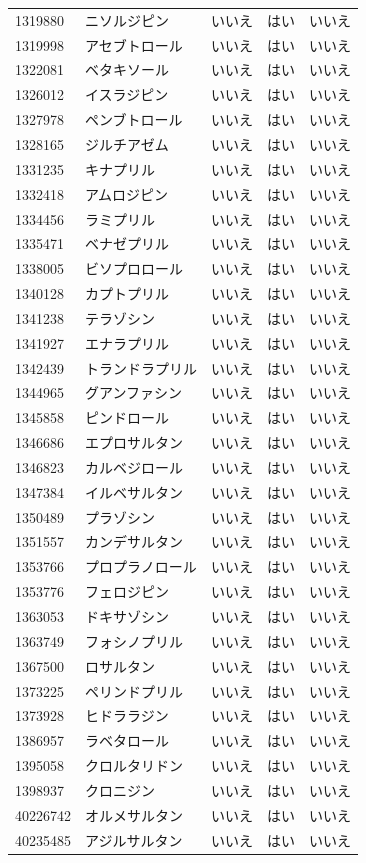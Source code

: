 \documentclass[
  11pt]{book}
\theoremstyle{definition}
\theoremstyle{definition}
\theoremstyle{definition}
\theoremstyle{definition}
\theoremstyle{remark}
\begin{document}
\begin{longtable}[]{@{}lllll@{}}
1319880 & ニソルジピン & いいえ & はい & いいえ \\
1319998 & アセブトロール & いいえ & はい & いいえ \\
1322081 & ベタキソール & いいえ & はい & いいえ \\
1326012 & イスラジピン & いいえ & はい & いいえ \\
1327978 & ペンブトロール & いいえ & はい & いいえ \\
1328165 & ジルチアゼム & いいえ & はい & いいえ \\
1331235 & キナプリル & いいえ & はい & いいえ \\
1332418 & アムロジピン & いいえ & はい & いいえ \\
1334456 & ラミプリル & いいえ & はい & いいえ \\
1335471 & ベナゼプリル & いいえ & はい & いいえ \\
1338005 & ビソプロロール & いいえ & はい & いいえ \\
1340128 & カプトプリル & いいえ & はい & いいえ \\
1341238 & テラゾシン & いいえ & はい & いいえ \\
1341927 & エナラプリル & いいえ & はい & いいえ \\
1342439 & トランドラプリル & いいえ & はい & いいえ \\
1344965 & グアンファシン & いいえ & はい & いいえ \\
1345858 & ピンドロール & いいえ & はい & いいえ \\
1346686 & エプロサルタン & いいえ & はい & いいえ \\
1346823 & カルベジロール & いいえ & はい & いいえ \\
1347384 & イルベサルタン & いいえ & はい & いいえ \\
1350489 & プラゾシン & いいえ & はい & いいえ \\
1351557 & カンデサルタン & いいえ & はい & いいえ \\
1353766 & プロプラノロール & いいえ & はい & いいえ \\
1353776 & フェロジピン & いいえ & はい & いいえ \\
1363053 & ドキサゾシン & いいえ & はい & いいえ \\
1363749 & フォシノプリル & いいえ & はい & いいえ \\
1367500 & ロサルタン & いいえ & はい & いいえ \\
1373225 & ペリンドプリル & いいえ & はい & いいえ \\
1373928 & ヒドララジン & いいえ & はい & いいえ \\
1386957 & ラベタロール & いいえ & はい & いいえ \\
1395058 & クロルタリドン & いいえ & はい & いいえ \\
1398937 & クロニジン & いいえ & はい & いいえ \\
40226742 & オルメサルタン & いいえ & はい & いいえ \\
40235485 & アジルサルタン & いいえ & はい & いいえ \\
\end{longtable}
\end{document}
